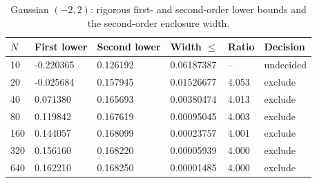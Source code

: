 \begin{table}[htbp]
\centering
\caption{Gaussian $(-2,2)$: rigorous first- and second-order lower bounds and the second-order enclosure width.}
\label{tab:quadratic_certificates}
\begin{tabular}{llllll}
\toprule
$N$ & First lower & Second lower & Width $\leq$ & Ratio & Decision \\
\midrule
10 & -0.220365 & 0.126192 & 0.06187387 & -- & undecided \\
20 & -0.025684 & 0.157945 & 0.01526677 & 4.053 & exclude \\
40 & 0.071380 & 0.165693 & 0.00380474 & 4.013 & exclude \\
80 & 0.119842 & 0.167619 & 0.00095045 & 4.003 & exclude \\
160 & 0.144057 & 0.168099 & 0.00023757 & 4.001 & exclude \\
320 & 0.156160 & 0.168220 & 0.00005939 & 4.000 & exclude \\
640 & 0.162210 & 0.168250 & 0.00001485 & 4.000 & exclude \\
\bottomrule
\end{tabular}
\end{table}
